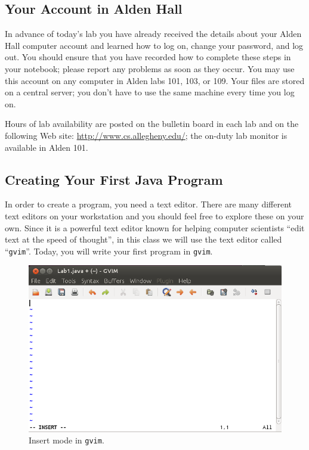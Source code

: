 \vspace*{-.3in}
\subsection*{Your Account in Alden Hall}

In advance of today's lab you have already received the details about your Alden Hall computer account and learned how
to log on, change your password, and log out.  You should ensure that you have recorded how to complete these steps in
your notebook; please report any problems as soon as they occur. You may use this account on any computer in Alden labs
101, 103, or 109. Your files are stored on a central server; you don't have to use the same machine every time you log
on.

Hours of lab availability are posted on the bulletin board in each lab and on the following Web site:
\url{http://www.cs.allegheny.edu/}; the on-duty lab monitor is available in Alden 101.

\vspace*{-.1in}
\subsection*{Creating Your First Java Program}

In order to create a program, you need a text editor. There are many different text editors on your workstation and
you should feel free to explore these on your own. Since it is a powerful text editor known for helping computer
scientists ``edit text at the speed of thought'', in this class we will use the text editor called ``{\tt gvim}''.
Today, you will write your first program in {\tt gvim}.


\begin{figure}[htbp]
  \centering
  \includegraphics[width=4.5in]{images/gvim-insert}
  \caption{Insert mode in {\tt gvim}.}
  \label{gvim-insert}
\end{figure}

